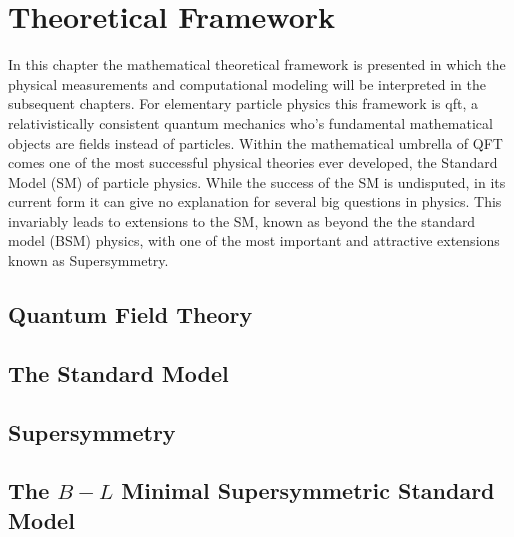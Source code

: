 \chapter[Theoretical Framework][Theoretical Framework]{Theoretical Framework} \label{ch:theory}

In this chapter the mathematical theoretical framework is presented in which the physical measurements and computational modeling will be interpreted in the subsequent chapters.
For elementary particle physics this framework is \gls{qft}, a relativistically consistent quantum mechanics who's fundamental mathematical objects are fields instead of particles.
Within the mathematical umbrella of QFT comes one of the most successful physical theories ever developed, the Standard Model (SM) of particle physics.
While the success of the SM is undisputed, in its current form it can give no explanation for several big questions in physics. 
This invariably leads to extensions to the SM, known as beyond the the standard model (BSM) physics, with one of the most important and attractive extensions known as Supersymmetry.


\section{Quantum Field Theory} \label{sec:qft}


\section{The Standard Model} \label{sec:sm}


%

\section{Supersymmetry}  \label{sec:susy}


\section{The $B-L$ Minimal Supersymmetric Standard Model} \label{sec:susybminusl}


